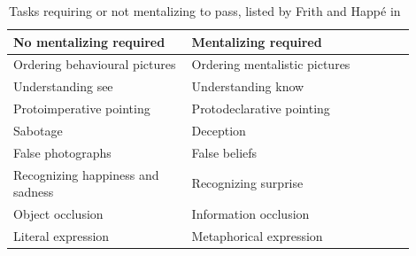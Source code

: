 \documentclass{sig-alternate}
\begin{document}
\begin{table}[h]
    \centering
    \begin{tabular}{p{0.4\linewidth}p{0.5\linewidth}}
        \toprule
        No mentalizing required           & Mentalizing required          \\
        \midrule
        Ordering behavioural pictures     & Ordering mentalistic pictures~\cite{baron1986mechanical} \\
        Understanding see                 & Understanding know~\cite{perner1989exploration}            \\
        Protoimperative pointing          & Protodeclarative pointing~\cite{baron1989perceptual}     \\
        Sabotage                          & Deception~\cite{sodian1992deception}                     \\
        False photographs                 & False beliefs~\cite{leslie1992domain}                 \\
        Recognizing happiness and sadness & Recognizing surprise~\cite{baron1993children}          \\
        Object occlusion                  & Information occlusion~\cite{baron1992out}         \\
        Literal expression                & Metaphorical expression~\cite{happe1993communicative}       \\
        \bottomrule
    \end{tabular}
    \caption{\small Tasks requiring or not mentalizing to pass, listed by Frith and Happé in~\cite{frith1994autism}}
    \label{mentalizing-tasks}
\end{table}
\end{document}
